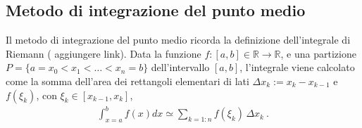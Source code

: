 \documentclass[letterpaper,10pt,italian]{jupyterBook}
\begin{document}
\subsection{Metodo di integrazione del punto medio}
\label{\detokenize{ch/numerics/integrals:metodo-di-integrazione-del-punto-medio}}
\sphinxAtStartPar
Il metodo di integrazione del punto medio ricorda la definizione dell’integrale di Riemann ( aggiungere link). Data la funzione \(f:[a,b] \in \mathbb{R} \rightarrow \mathbb{R}\), e una partizione \(P = \{ a = x_0 < x_1 < \dots < x_n = b \}\) dell’intervallo \([a,b]\), l’integrale viene calcolato come la somma dell’area dei rettangoli elementari di lati \(\Delta x_k := x_k - x_{k-1}\) e \(f(\xi_k)\), con \(\xi_k \in [x_{k-1}, x_k]\),
\begin{equation*}
\begin{split}\int_{x=a}^{b} f(x) dx \simeq \sum_{k=1:n} f(\xi_k) \, \Delta x_k \ . \end{split}
\end{equation*}
\end{document}
